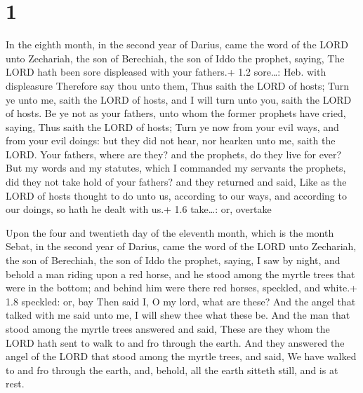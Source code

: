 \hypertarget{section}{%
\section{1}\label{section}}

 In the eighth month, in the second year of Darius, came the
word of the LORD unto Zechariah, the son of Berechiah, the son of Iddo
the prophet, saying,  The LORD hath been sore displeased
with your fathers.+ 1.2 sore\ldots: Heb. with displeasure 
Therefore say thou unto them, Thus saith the LORD of hosts; Turn ye unto
me, saith the LORD of hosts, and I will turn unto you, saith the LORD of
hosts.  Be ye not as your fathers, unto whom the former
prophets have cried, saying, Thus saith the LORD of hosts; Turn ye now
from your evil ways, and from your evil doings: but they did not hear,
nor hearken unto me, saith the LORD.  Your fathers, where
are they? and the prophets, do they live for ever?  But my
words and my statutes, which I commanded my servants the prophets, did
they not take hold of your fathers? and they returned and said, Like as
the LORD of hosts thought to do unto us, according to our ways, and
according to our doings, so hath he dealt with us.+ 1.6 take\ldots: or,
overtake

 Upon the four and twentieth day of the eleventh month,
which is the month Sebat, in the second year of Darius, came the word of
the LORD unto Zechariah, the son of Berechiah, the son of Iddo the
prophet, saying,  I saw by night, and behold a man riding
upon a red horse, and he stood among the myrtle trees that were in the
bottom; and behind him were there red horses, speckled, and white.+ 1.8
speckled: or, bay  Then said I, O my lord, what are these?
And the angel that talked with me said unto me, I will shew thee what
these be.  And the man that stood among the myrtle trees
answered and said, These are they whom the LORD hath sent to walk to and
fro through the earth.  And they answered the angel of the
LORD that stood among the myrtle trees, and said, We have walked to and
fro through the earth, and, behold, all the earth sitteth still, and is
at rest.

